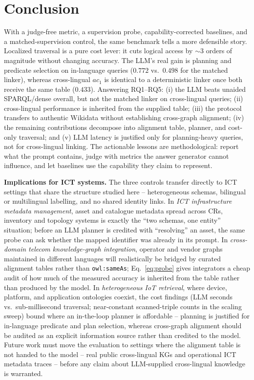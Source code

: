 \documentclass[a4paper,fleqn]{cas-dc}
\newcommand{\ac}[0]{\ensuremath{ac_1}}
\begin{document}
\section{Conclusion}\label{sec:conclusion}
With a judge-free metric, a supervision probe, capability-corrected baselines,
and a matched-supervision control, the same benchmark tells a more defensible
story. Localized traversal is a pure cost lever: it cuts logical access by
$\sim$3 orders of magnitude without changing accuracy. The LLM's real gain is
planning and predicate selection on in-language queries ($0.772$ vs.\ $0.498$
for the matched linker), whereas cross-lingual \ac{} is identical to a
deterministic linker once both receive the same table ($0.433$). Answering
RQ1--RQ5: (i) the LLM beats unaided SPARQL/dense overall, but not the matched
linker on cross-lingual queries; (ii) cross-lingual performance is inherited
from the supplied table; (iii) the protocol transfers to authentic Wikidata
without establishing cross-graph alignment; (iv) the remaining contributions
decompose into alignment table, planner, and cost-only traversal; and (v) LLM
latency is justified only for planning-heavy queries, not for cross-lingual
linking. The actionable lessons are methodological: report what the prompt
contains, judge with metrics the answer generator cannot influence, and let
baselines use the capability they claim to represent.

\textbf{Implications for ICT systems.} The three controls transfer directly
to ICT settings that share the structure studied here -- heterogeneous
schemas, bilingual or multilingual labelling, and no shared identity links.
In \emph{ICT infrastructure metadata management}, asset and catalogue
metadata spread across CRs, inventory and topology systems is exactly the
``two schemas, one entity'' situation; before an LLM planner is credited
with ``resolving'' an asset, the same probe can ask whether the mapped
identifier was already in its prompt. In \emph{cross-domain telecom
knowledge-graph integration}, operator and vendor graphs maintained in
different languages will realistically be bridged by curated alignment
tables rather than \texttt{owl:sameAs}; Eq.~\eqref{eq:probe} gives
integrators a cheap audit of how much of the measured accuracy is inherited
from the table rather than produced by the model. In \emph{heterogeneous
IoT retrieval}, where device, platform, and application ontologies coexist,
the cost findings (LLM seconds vs.\ sub-millisecond traversal; near-constant
scanned-triple counts in the scaling sweep) bound where an in-the-loop planner
is affordable --
planning is justified for in-language predicate and plan selection, whereas
cross-graph alignment should be audited as an explicit information source
rather than credited to the model. Future work must move the evaluation
to settings where the alignment table is not handed to the model -- real
public cross-lingual KGs and operational ICT metadata traces -- before any
claim about LLM-supplied cross-lingual knowledge is warranted.
\end{document}
